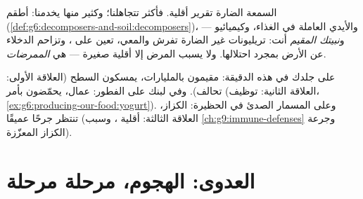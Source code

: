 \begin{proposition}\label{prop:g9:microbes-and-infection:mostly}
السمعة الضارة تقرير أقلية. فأكثر  تتجاهلنا؛
وكثير منها يخدمنا: أطقم 
(\cref{def:g6:decomposers-and-soil:decomposers})،
والأيدي العاملة في الغذاء، وكيميائيو  ---
و\emph{نبيتك المقيم} أنت: تريليونات
 غير الضارة تفرش  والمعي، تعين على ،
وتزاحم الدخلاء عن الأرض بمجرد احتلالها. ولا يسبب المرض
إلا أقلية صغيرة --- هي \emph{الممرضات}.
\end{proposition}
\admitted

\begin{example}\label{ex:g9:microbes-and-infection:relations}
على جلدك في هذه الدقيقة: مقيمون بالمليارات، يمسكون
السطح (العلاقة الأولى: تحالف). وفي لبنك على الفطور:
عمال، يحمّضون بأمر (العلاقة الثانية: توظيف،
\cref{ex:g6:producing-our-food:yogurt}). وعلى المسمار
الصدئ في الحظيرة:   الكزاز، تنتظر جرحًا
عميقًا (العلاقة الثالثة: أقلية ، وسبب
\cref{ch:g9:immune-defenses} وجرعة الكزاز المعزّزة).
\end{example}

\section{العدوى: الهجوم، مرحلة مرحلة}

